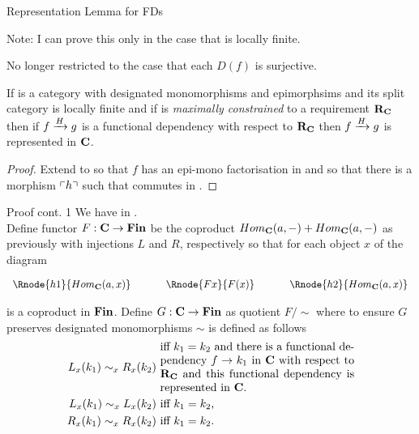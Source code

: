 \begin{frame}{Representation Lemma for FDs}
{\small Note: I can prove this only in the case that \catcw is locally finite.

No longer restricted to the case that each $D(f)$ is surjective.}

\begin{lemma}
If \catcw is a category with designated monomorphisms and epimorphsims and its split category
is locally finite and if \catcw is
\textit{maximally constrained} to a requirement $\reqtc$ then
if $\fundep{H}{f}{g}$  is a functional dependency with respect to $\reqtc$
then $\fundep{H}{f}{g}$ is represented in $\catc$.
\end{lemma} 
\begin{proof} Extend \catcw to \catcpw so that $f$ has an epi-mono factorisation in \catcpw
and so that there  is a morphism $\qq{h}$ such that
commutes in \catcp.  
\end{proof}
\end{frame}

\begin{frame}{Proof cont. 1}
We have \fgsourcediagram in \catc.\\
\medskip
Define functor $F: \catc \morph \Fin$ be the coproduct $Hom_{\catc}(a,-) + Hom_{\catc}(a,-)$
as previously with injections $L$ and $R$, respectively so that
for each object $x$ of \catcw the diagram
\begin{center}
$
\begin{array}{c p{0.5cm} c p{0.5cm} c  }
\Rnode{h1}{Hom_{\catc}(a,x)}  &&\Rnode{Fx}{F(x)}  &&   \Rnode{h2}{Hom_{\catc}(a,x)}       
\end{array} 
$
\end{center}
is a coproduct in $\Fin$.
\medskip
Define $G: \catc \morph \Fin$ as quotient $F/\sim$ where 
to ensure $G$ preserves designated monomorphisms  $\sim$ is defined as follows
\begin{align*}
L_x(k_1) \sim_x R_x(k_2) & \mbox{ \parbox{6cm}{iff  $k_1=k_2$ and there is a functional dependency 
$f \morph k_1$ in \catcw with respect to $\reqtc$ and  this functional dependency is represented in \catc.}}\\
L_x(k_1) \sim_x L_x(k_2) & \mbox{ iff $k_1 = k_2$,} \\
R_x(k_1) \sim_x R_x(k_2) & \mbox{ iff $k_1 = k_2$.} \\
\end{align*} 
\end{frame}

